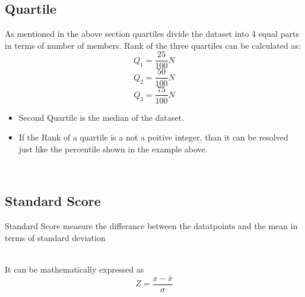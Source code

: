 \documentclass[twoside,12pt]{report}  %
\begin{document}
\subsection{Quartile}
As mentioned in the above section quartiles divide the dataset into 4 equal parts in terms of number of members. Rank of the three quartiles can be calculated as:
$$ \boxed{Q_1 = \frac{25}{100}N} $$
$$ \boxed{Q_2 = \frac{50}{100}N} $$
$$ \boxed{Q_3 = \frac{75}{100}N} $$
\begin{itemize}
	\item Second Quartile is the median of the dataset.
	\item If the Rank of a quartile is a not a poitive integer, than it can be resolved just like the percentile shown in the example above.
\end{itemize}

\noindent
\\
\subsection{Standard Score}
\begin{tcolorbox}[colback=red!5!white, colframe=red!75!black, title = \textbf{Standard Score}]
	Standard Score measure the differance between the datatpoints and the mean in terms of standard deviation
\end{tcolorbox}
\noindent
\\
It can be mathematically expressed as 
$$ \boxed{Z = \frac{x-\bar{x}}{\sigma}} $$
\end{document}

